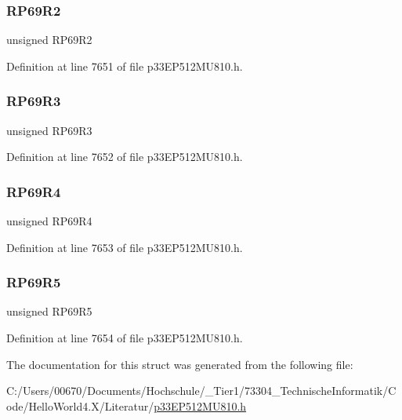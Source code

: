 \subsubsection{\texorpdfstring{R\+P69\+R2}{RP69R2}}
{\footnotesize\ttfamily unsigned R\+P69\+R2}



Definition at line 7651 of file p33\+E\+P512\+M\+U810.\+h.

\mbox{\label{structtag_r_p_o_r2_b_i_t_s_a6d3c5e389b267fb5085d794efa43ff83}} 
\subsubsection{\texorpdfstring{R\+P69\+R3}{RP69R3}}
{\footnotesize\ttfamily unsigned R\+P69\+R3}



Definition at line 7652 of file p33\+E\+P512\+M\+U810.\+h.

\mbox{\label{structtag_r_p_o_r2_b_i_t_s_a2fa11325c8da84c1da42c4474119885e}} 
\subsubsection{\texorpdfstring{R\+P69\+R4}{RP69R4}}
{\footnotesize\ttfamily unsigned R\+P69\+R4}



Definition at line 7653 of file p33\+E\+P512\+M\+U810.\+h.

\mbox{\label{structtag_r_p_o_r2_b_i_t_s_adb6be4ba8afcb120225d98c975a47fd9}} 
\subsubsection{\texorpdfstring{R\+P69\+R5}{RP69R5}}
{\footnotesize\ttfamily unsigned R\+P69\+R5}



Definition at line 7654 of file p33\+E\+P512\+M\+U810.\+h.



The documentation for this struct was generated from the following file\+:\begin{DoxyCompactItemize}
\item 
C\+:/\+Users/00670/\+Documents/\+Hochschule/\+\_\+\+Tier1/73304\+\_\+\+Technische\+Informatik/\+Code/\+Hello\+World4.\+X/\+Literatur/\hyperlink{p33_e_p512_m_u810_8h}{p33\+E\+P512\+M\+U810.\+h}\end{DoxyCompactItemize}
